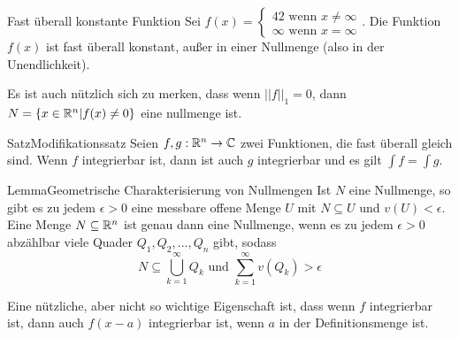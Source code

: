 \begin{Beispiel}{Fast überall konstante Funktion}
Sei $f(x)=\begin{cases}42 \mbox{ wenn $x\neq \infty$} \\
\infty \mbox{ wenn $x=\infty$}\end{cases}$. Die Funktion $f(x)$ ist fast überall konstant, außer in einer Nullmenge (also in der Unendlichkeit). 
\end{Beispiel}
Es ist auch nützlich sich zu merken, dass wenn $||f||_1=0$, dann $N=\{ x\in \mathbb{R}^n | f(x)\neq 0\}$ eine nullmenge ist.
\begin{Satz}{Satz}{Modifikationssatz}
Seien $f,g:\mathbb{R}^n\rightarrow \mathbb{C}$ zwei Funktionen, die fast überall gleich sind. Wenn $f$ integrierbar ist, dann ist auch $g$ integrierbar und es gilt $\int f = \int g$.
\end{Satz}
\begin{Satz}{Lemma}{Geometrische Charakterisierung von Nullmengen}
    Ist $N$ eine Nullmenge, so gibt es zu jedem $\epsilon>0$ eine messbare offene Menge $U$ mit $N\subseteq U$ und $v(U)<\epsilon$. \\
    Eine Menge $N\subseteq \mathbb{R}^n$ ist genau dann eine Nullmenge, wenn es zu jedem $\epsilon>0$ abzählbar viele Quader $Q_1, Q_2, ..., Q_n$ gibt, sodass
    $$N\subseteq \bigcup_{k=1}^{\infty}Q_k \mbox{ und }\sum_{k=1}^\infty v(Q_k)>\epsilon$$
\end{Satz}
Eine nützliche, aber nicht so wichtige Eigenschaft ist, dass wenn $f$ integrierbar ist, dann auch $f(x-a)$ integrierbar ist, wenn $a$ in der Definitionsmenge ist.
\newpage
